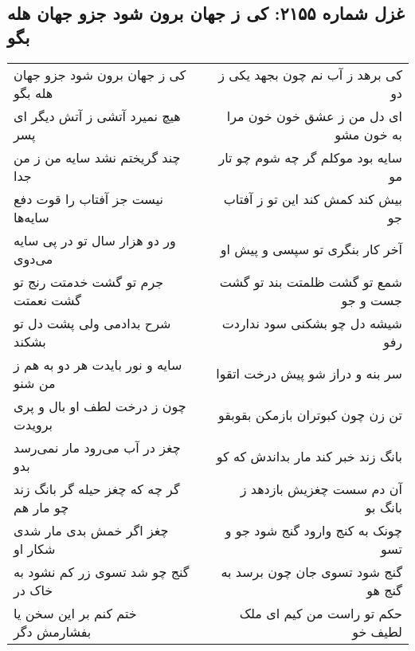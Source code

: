 \begin{center}
\section*{غزل شماره ۲۱۵۵: کی ز جهان برون شود جزو جهان هله بگو}
\label{sec:2155}
\begin{longtable}{l p{0.5cm} r}
کی ز جهان برون شود جزو جهان هله بگو
&&
کی برهد ز آب نم چون بجهد یکی ز دو
\\
هیچ نمیرد آتشی ز آتش دیگر ای پسر
&&
ای دل من ز عشق خون خون مرا به خون مشو
\\
چند گریختم نشد سایه من ز من جدا
&&
سایه بود موکلم گر چه شوم چو تار مو
\\
نیست جز آفتاب را قوت دفع سایه‌ها
&&
بیش کند کمش کند این تو ز آفتاب جو
\\
ور دو هزار سال تو در پی سایه می‌دوی
&&
آخر کار بنگری تو سپسی و پیش او
\\
جرم تو گشت خدمتت رنج تو گشت نعمتت
&&
شمع تو گشت ظلمتت بند تو گشت جست و جو
\\
شرح بدادمی ولی پشت دل تو بشکند
&&
شیشه دل چو بشکنی سود نداردت رفو
\\
سایه و نور بایدت هر دو به هم ز من شنو
&&
سر بنه و دراز شو پیش درخت اتقوا
\\
چون ز درخت لطف او بال و پری برویدت
&&
تن زن چون کبوتران بازمکن بقوبقو
\\
چغز در آب می‌رود مار نمی‌رسد بدو
&&
بانگ زند خبر کند مار بداندش که کو
\\
گر چه که چغز حیله گر بانگ زند چو مار هم
&&
آن دم سست چغزیش بازدهد ز بانگ بو
\\
چغز اگر خمش بدی مار شدی شکار او
&&
چونک به کنج وارود گنج شود جو و تسو
\\
گنج چو شد تسوی زر کم نشود به خاک در
&&
گنج شود تسوی جان چون برسد به گنج هو
\\
ختم کنم بر این سخن یا بفشارمش دگر
&&
حکم تو راست من کیم ای ملک لطیف خو
\\
\end{longtable}
\end{center}
